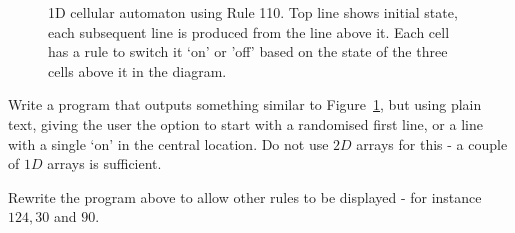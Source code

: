 \begin{figure}[ht]
\caption{1D cellular automaton using Rule 110. Top line shows initial state,
each subsequent line is produced from the line above it. Each cell has
a rule to switch it `on' or 'off' based on the state of the three cells
above it in the diagram.}
\label{rulle110_fig}
\end{figure}

\begin{exercise} Write a program that outputs something similar to
Figure~\ref{rulle110_fig}, but using plain text, giving the user
the option to start with a randomised first line, or a line with a
single `on' in the central location. Do not use $2D$ arrays for this -
a couple of $1D$ arrays is sufficient.  \end{exercise}

\begin{exercise}
Rewrite the program above to allow other rules to be displayed - for instance $124, 30$ and $90$.
\end{exercise}

